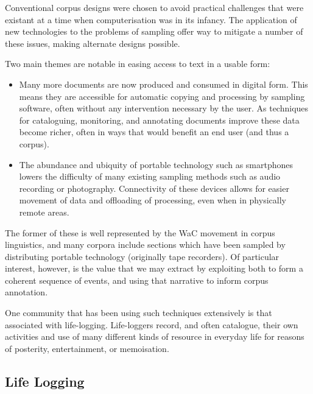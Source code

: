 Conventional corpus designs were chosen to avoid practical challenges that were existant at a time when computerisation was in its infancy.  The application of new technologies to the problems of sampling offer way to mitigate a number of these issues, making alternate designs possible.

Two main themes are notable in easing access to text in a usable form:

\begin{itemize}
    \item Many more documents are now produced and consumed in digital form.  This means they are accessible for automatic copying and processing by sampling software, often without any intervention necessary by the user.  As techniques for cataloguing, monitoring, and annotating documents improve these data become richer, often in ways that would benefit an end user (and thus a corpus).
    \item The abundance and ubiquity of portable technology such as smartphones lowers the difficulty of many existing sampling methods such as audio recording or photography.  Connectivity of these devices allows for easier movement of data and offloading of processing, even when in physically remote areas.
\end{itemize}


The former of these is well represented by the WaC movement in corpus linguistics, and many corpora include sections which have been sampled by distributing portable technology (originally tape recorders).  Of particular interest, however, is the value that we may extract by exploiting both to form a coherent sequence of events, and using that narrative to inform corpus annotation.

One community that has been using such techniques extensively is that associated with life-logging.  Life-loggers record, and often catalogue, their own activities and use of many different kinds of resource in everyday life for reasons of posterity, entertainment, or memoisation.










\subsection{Life Logging}

